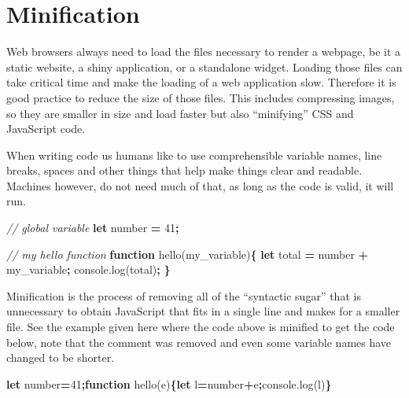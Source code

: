 \documentclass[
  10pt,
]{krantz}
\makeatletter
\newenvironment{Shaded}{\begin{snugshade}}{\end{snugshade}}
\newcommand{\AttributeTok}[1]{\textcolor[rgb]{0.61,0.61,0.61}{#1}}
\newcommand{\CommentTok}[1]{\textcolor[rgb]{0.37,0.37,0.37}{\textit{#1}}}
\newcommand{\DecValTok}[1]{\textcolor[rgb]{0.06,0.06,0.06}{#1}}
\newcommand{\KeywordTok}[1]{\textcolor[rgb]{0.27,0.27,0.27}{\textbf{#1}}}
\newcommand{\NormalTok}[1]{#1}
\newcommand{\OperatorTok}[1]{\textcolor[rgb]{0.43,0.43,0.43}{\textbf{#1}}}
\newcommand{\VariableTok}[1]{\textcolor[rgb]{0,0,0}{#1}}
\newenvironment{kframe}{%
\medskip{}
\setlength{\fboxsep}{.8em}
 \def\at@end@of@kframe{}%
 \ifinner\ifhmode%
  \def\at@end@of@kframe{\end{minipage}}%
  \begin{minipage}{\columnwidth}%
 \fi\fi%
 \def\FrameCommand##1{\hskip\@totalleftmargin \hskip-\fboxsep
 \colorbox{shadecolor}{##1}\hskip-\fboxsep
     \hskip-\linewidth \hskip-\@totalleftmargin \hskip\columnwidth}%
 \MakeFramed {\advance\hsize-\width
   \@totalleftmargin\z@ \linewidth\hsize
   \@setminipage}}%
 {\par\unskip\endMakeFramed%
 \at@end@of@kframe}
\renewenvironment{Shaded}{\begin{kframe}}{\end{kframe}}
\makeatother
\begin{document}
\hypertarget{webpack-minification}{%
\section{Minification}\label{webpack-minification}}

Web browsers always need to load the files necessary to render a webpage, be it a static website, a shiny application, or a standalone widget. Loading those files can take critical time and make the loading of a web application slow. Therefore it is good practice to reduce the size of those files. This includes compressing images, so they are smaller in size and load faster but also ``minifying'' CSS and JavaScript code.

When writing code us humans like to use comprehensible variable names, line breaks, spaces and other things that help make things clear and readable. Machines however, do not need much of that, as long as the code is valid, it will run.

\begin{Shaded}
\begin{Highlighting}[]
\CommentTok{// global variable}
\KeywordTok{let}\NormalTok{ number }\OperatorTok{=} \DecValTok{41}\OperatorTok{;}

\CommentTok{// my hello function}
\KeywordTok{function} \AttributeTok{hello}\NormalTok{(my\_variable)}\OperatorTok{\{}
    \KeywordTok{let}\NormalTok{ total }\OperatorTok{=}\NormalTok{ number }\OperatorTok{+}\NormalTok{ my\_variable}\OperatorTok{;}
    \VariableTok{console}\NormalTok{.}\AttributeTok{log}\NormalTok{(total)}\OperatorTok{;}
\OperatorTok{\}}
\end{Highlighting}
\end{Shaded}

Minification is the process of removing all of the ``syntactic sugar'' that is unnecessary to obtain JavaScript that fits in a single line and makes for a smaller file. See the example given here where the code above is minified to get the code below, note that the comment was removed and even some variable names have changed to be shorter.

\begin{Shaded}
\begin{Highlighting}[]
\KeywordTok{let}\NormalTok{ number}\OperatorTok{=}\DecValTok{41}\OperatorTok{;}\KeywordTok{function} \AttributeTok{hello}\NormalTok{(e)}\OperatorTok{\{}\KeywordTok{let}\NormalTok{ l}\OperatorTok{=}\NormalTok{number}\OperatorTok{+}\NormalTok{e}\OperatorTok{;}\VariableTok{console}\NormalTok{.}\AttributeTok{log}\NormalTok{(l)}\OperatorTok{\}}
\end{Highlighting}
\end{Shaded}
\end{document}
